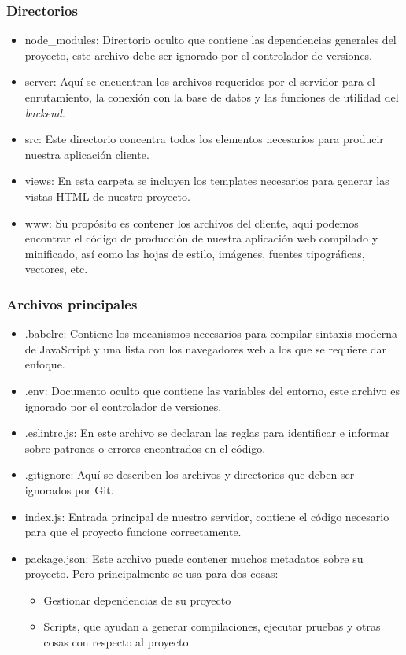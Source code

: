 \subsubsection{Directorios}
\begin{itemize}
  \item node\_modules: Directorio oculto que contiene las dependencias generales del proyecto, este archivo debe ser ignorado por el controlador de versiones.
  \item server: Aquí se encuentran los archivos requeridos por el servidor para el enrutamiento, la conexión con la base de datos y las funciones de utilidad del \textit{backend}.
  \item src: Este directorio concentra todos los elementos necesarios para producir nuestra aplicación cliente.
  \item views: En esta carpeta se incluyen los templates necesarios para generar las vistas HTML de nuestro proyecto.
  \item www: Su propósito es contener los archivos del cliente, aquí podemos encontrar el código de producción de nuestra aplicación web compilado y minificado, así como las hojas de estilo, imágenes, fuentes tipográficas, vectores, etc.
\end{itemize}

\subsubsection{Archivos principales}
\begin{itemize}
  \item .babelrc: Contiene los mecanismos necesarios para compilar sintaxis moderna de JavaScript y una lista con los navegadores web a los que se requiere dar enfoque.
  \item .env: Documento oculto que contiene las variables del entorno, este archivo es ignorado por el controlador de versiones.
  \item .eslintrc.js: En este archivo se declaran las reglas para identificar e informar sobre patrones o errores encontrados en el código.
  \item .gitignore: Aquí se describen los archivos y directorios que deben ser ignorados por Git.
  \item index.js: Entrada principal de nuestro servidor, contiene el código necesario para que el proyecto funcione correctamente.
  \item package.json: Este archivo puede contener muchos metadatos sobre su proyecto. Pero principalmente se usa para dos cosas:
  \begin{itemize}
    \item Gestionar dependencias de su proyecto
    \item Scripts, que ayudan a generar compilaciones, ejecutar pruebas y otras cosas con respecto al proyecto
  \end{itemize}
\end{itemize}

